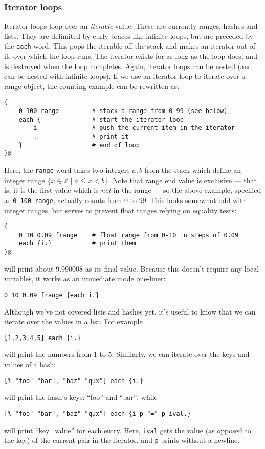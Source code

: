 \subsubsection{Iterator loops}
Iterator loops loop over an \emph{iterable} value. These are currently ranges,
hashes and lists. They are delimited by curly braces like infinite loops,
but are preceded by the 
\texttt{each} word. This pops the iterable off the stack and makes an
iterator out of it, over which the loop runs. The iterator exists for as 
long as the loop does, and is destroyed when the loop completes. Again, iterator
loops can be nested (and can be nested with infinite loops). If we use
an iterator loop to iterate over a range object,
the counting example can be rewritten as:
\begin{lstlisting}
(
    0 100 range         # stack a range from 0-99 (see below)
    each {              # start the iterator loop
        i               # push the current item in the iterator
        .               # print it
    }                   # end of loop
)@
\end{lstlisting}
Here, the \texttt{range} word takes two integers $a,b$ from the stack which define
an integer range $\{x\in \mathbb{Z} \mid a \le x < b\}$.
Note that range end value is exclusive --- that is, it is the first value which
is \emph{not} in the range --- so the above example, specified as
\texttt{0 100 range}, actually counts from 0 to 99. 
This looks somewhat odd with integer ranges, but serves to prevent float ranges
relying on equality tests:
\begin{lstlisting}
(
    0 10 0.09 frange    # float range from 0-10 in steps of 0.09
    each {i.}           # print them
)@
\end{lstlisting}
will print about 9.990008 as its final value. Because this doesn't require
any local variables, it works as an immediate mode one-liner:
\begin{lstlisting}
0 10 0.09 frange {each i.}
\end{lstlisting}

Although we've not covered lists and hashes yet, it's useful to know that we can
iterate over the values in a list. For example
\begin{lstlisting}
[1,2,3,4,5] each {i.}
\end{lstlisting}
will print the numbers from 1 to 5. Similarly, we can iterate over the keys 
and values of a hash:
\begin{lstlisting}
[% "foo" "bar", "baz" "qux"] each {i.}
\end{lstlisting}
will print the hash's keys: ``foo'' and ``bar'', while
\begin{lstlisting}
[% "foo" "bar", "baz" "qux"] each {i p "=" p ival.}
\end{lstlisting}
will print ``key=value'' for each entry. Here, \texttt{ival} gets the value
(as opposed to the key)
of the current pair in the iterator, 
and \texttt{p} prints without a newline.

